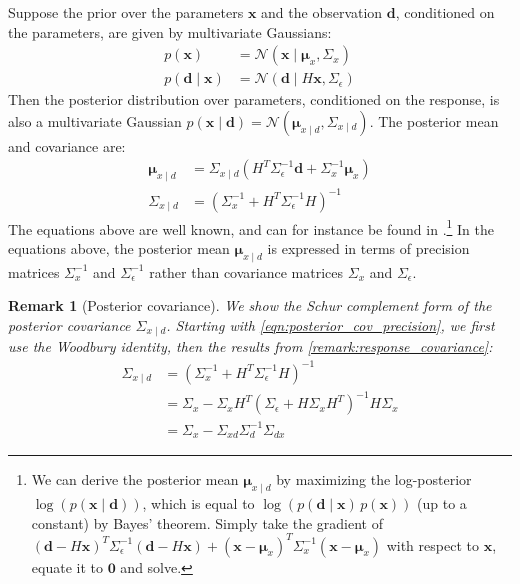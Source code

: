 \documentclass[12pt, a4paper]{article}
\theoremstyle{spaced}
\theoremstyle{spaceddef}
\numberwithin{equation}{section}
\newtheorem{remarkinner}[theorem]{Remark}
\newenvironment{remark}
{\savenotes
    \begin{tcolorbox}[colback=white, colframe=black!80, arc=4pt, boxrule=0.5pt]%
        \begin{remarkinner}}
        {\end{remarkinner}\end{tcolorbox}\spewnotes}
\begin{document}
Suppose the prior over the parameters $\bm{x}$ and the observation $\bm{d}$, conditioned on the parameters, are given by multivariate Gaussians:
\begin{equation}
    \label{eqn:model_def_gaussian}
    \begin{aligned}
        p(\bm{x}) &= \mathcal{N}\left( \bm{x} \mid \bm{\mu}_x, \Sigma_x \right) \\
        p(\bm{d} \mid \bm{x}) &= \mathcal{N}( \bm{d} \mid H\bm{x}, \Sigma_{\epsilon})
    \end{aligned}
\end{equation}
Then the posterior distribution over parameters, conditioned on the response, is also a multivariate Gaussian $p(\bm{x} \mid \bm{d}) = \mathcal{N} (\bm{\mu}_{x \mid d}, \Sigma_{x \mid d})$.
The posterior mean and covariance are:
\begin{align}
    \bm{\mu}_{x \mid d} &=
    \Sigma_{x \mid d} \left(
    H^T \Sigma_\epsilon^{-1} \bm{d} + \Sigma_x^{-1} \bm{\mu}_x
    \right)
    \label{eqn:posterior_mean_precision}
    \\
    \Sigma_{x \mid d} &=
    \left( \Sigma_x^{-1} + H^T \Sigma_\epsilon^{-1} H  \right)^{-1}
        \label{eqn:posterior_cov_precision}
\end{align}
The equations above are well known, and can for instance be found in \citet[Section~2.3.3]{BISH11}.\footnote{We can derive the posterior mean $\bm{\mu}_{x \mid d}$ by maximizing the log-posterior $\log ( p(\bm{x} \mid \bm{d}))$, which is equal to  $\log ( p(\bm{d} \mid \bm{x}) \, p(\bm{x}))$ (up to a constant) by Bayes' theorem.
Simply take the gradient of
$(\bm{d} - H \bm{x})^T \Sigma_\epsilon^{-1} (\bm{d} - H \bm{x})
+
(\bm{x} - \bm{\mu}_x)^T \Sigma_x^{-1} (\bm{x} - \bm{\mu}_x)
$ with respect to $\bm{x}$, equate it to $\bm{0}$ and solve.}
In the equations above, the posterior mean $\bm{\mu}_{x \mid d}$ is expressed in terms of precision matrices $\Sigma_x^{-1}$ and $\Sigma_\epsilon^{-1}$ rather than covariance matrices $\Sigma_x$ and $\Sigma_\epsilon$.

\begin{remark}[Posterior covariance]
    \label{remark:posterior_covariance}
    We show the Schur complement form of the posterior covariance $\Sigma_{x \mid d}$.
    Starting with \cref{eqn:posterior_cov_precision}, we first use the Woodbury identity, then the results from \cref{remark:response_covariance}:
\begin{align*}
    \Sigma_{x \mid d} &=
    \left( \Sigma_x^{-1} + H^T \Sigma_\epsilon^{-1} H  \right)^{-1} \\
    &= \Sigma_x - \Sigma_x H^T
    \left(
    \Sigma_\epsilon + H \Sigma_x H^T
    \right)^{-1}
    H \Sigma_x \\
    &= \Sigma_x - \Sigma_{xd}
    \Sigma_d^{-1}
    \Sigma_{dx}
\end{align*}
\end{remark}
\end{document}
